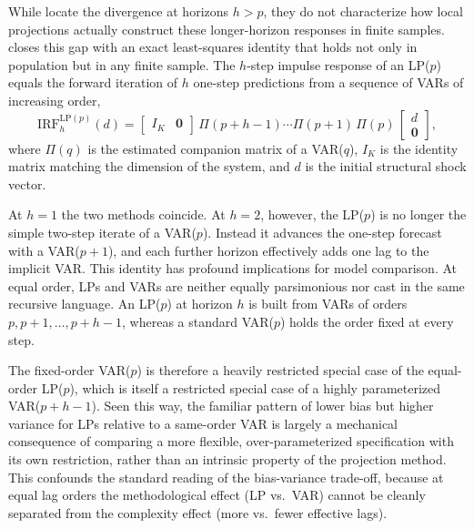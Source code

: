 While \textcite{plagborg2021local} locate the divergence at horizons $h > p$, they do not
characterize how local projections actually construct these longer-horizon responses in finite
samples. \textcite{ludwig2026local} closes this gap with an exact least-squares identity that holds
not only in population but in any finite sample. The $h$-step impulse response of an LP($p$) equals
the forward iteration of $h$ one-step predictions from a sequence of VARs of increasing order,
%
\begin{equation}
  \mathrm{IRF}^{\mathrm{LP}(p)}_h(d) =
  \begin{bmatrix} I_K & \mathbf{0} \end{bmatrix}\,
  \Pi(p+h-1)\cdots\Pi(p+1)\,\Pi(p)\,
  \begin{bmatrix} d \\ \mathbf{0} \end{bmatrix},
  \label{eq:ludwig_identity}
\end{equation}
%
where $\Pi(q)$ is the estimated companion matrix of a VAR($q$), $I_K$ is the identity matrix matching
the dimension of the system, and $d$ is the initial structural shock vector.

At $h=1$ the two methods coincide. At $h=2$, however, the LP($p$) is no longer the simple two-step
iterate of a VAR($p$). Instead it advances the one-step forecast with a VAR($p+1$), and each further
horizon effectively adds one lag to the implicit VAR. This identity has profound implications for
model comparison. At equal order, LPs and VARs are neither equally parsimonious nor cast in the same
recursive language. An LP($p$) at horizon $h$ is built from VARs of orders $p, p+1, \dots, p+h-1$,
whereas a standard VAR($p$) holds the order fixed at every step.

The fixed-order VAR($p$) is therefore a heavily restricted special case of the equal-order LP($p$),
which is itself a restricted special case of a highly parameterized VAR($p+h-1$). Seen this way, the
familiar pattern of lower bias but higher variance for LPs relative to a same-order VAR is largely a
mechanical consequence of comparing a more flexible, over-parameterized specification with its own
restriction, rather than an intrinsic property of the projection method. This confounds the standard
reading of the bias-variance trade-off, because at equal lag orders the methodological effect
(LP vs.\ VAR) cannot be cleanly separated from the complexity effect (more vs.\ fewer effective lags).

\FloatBarrier